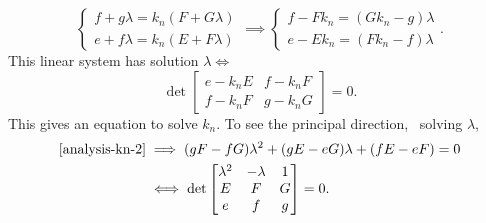 \begin{enumerate}[(1)]
\[\begin{cases}
                f+g\lambda=k_n(F+G\lambda) \\
                e+f\lambda=k_n(E+F\lambda)
            \end{cases}\implies \begin{cases}
            f-Fk_n=(Gk_n-g)\lambda \\
            e-Ek_n=(Fk_n-f)\lambda
            \end{cases}
        .\] This linear system has solution \(\lambda\iff \) \[
            \det\begin{bmatrix}
                e-k_n E & f-k_n F \\
                f-k_n F & g-k_n G
            \end{bmatrix}=0
        .\] This gives an equation to solve \(k_n\).
        To see the principal direction, \ie\ solving \(\lambda\),
        \begin{align*}
            \text{\cref{analysis-kn-2}}
            &\implies (gF-fG)\lambda^2+(gE-eG)\lambda+(fE-eF)=0 \\
            &\iff \det\begin{bmatrix}
                \lambda^2 & -\lambda & 1 \\
                E & F & G \\
                e & f & g
            \end{bmatrix}=0
        .\end{align*}
\end{enumerate}


\newpage
